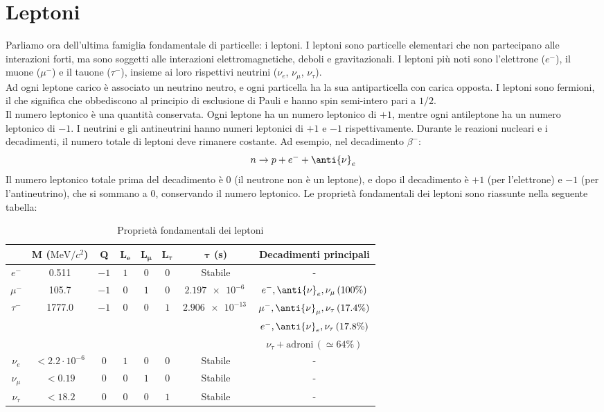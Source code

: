 \section{Leptoni}
Parliamo ora dell'ultima famiglia fondamentale di particelle: i leptoni. I leptoni sono particelle elementari che non partecipano alle interazioni forti, ma sono soggetti alle interazioni elettromagnetiche, deboli e gravitazionali. I leptoni più noti sono l'elettrone ($e^-$), il muone ($\mu^-$) e il tauone ($\tau^-$), insieme ai loro rispettivi neutrini ($\nu_{e}$, $\nu_{\mu}$, $\nu_{\tau}$).\\
Ad ogni leptone carico è associato un neutrino neutro, e ogni particella ha la sua antiparticella con carica opposta. I leptoni sono fermioni, il che significa che obbediscono al principio di esclusione di Pauli e hanno spin semi-intero pari a $1/2$.\\
Il numero leptonico è una quantità conservata. Ogni leptone ha un numero leptonico di $+1$, mentre ogni antileptone ha un numero leptonico di $-1$. I neutrini e gli antineutrini hanno numeri leptonici di $+1$ e $-1$ rispettivamente. Durante le reazioni nucleari e i decadimenti, il numero totale di leptoni deve rimanere costante. Ad esempio, nel decadimento $\beta^-$:
\begin{equation}
    n \to p + e^- + \anti{\nu}_{e}
\end{equation}
Il numero leptonico totale prima del decadimento è $0$ (il neutrone non è un leptone), e dopo il decadimento è $+1$ (per l'elettrone) e $-1$ (per l'antineutrino), che si sommano a $0$, conservando il numero leptonico. Le proprietà fondamentali dei leptoni sono riassunte nella seguente tabella:
\begin{table}[H]
    \centering
    \begin{tabular}{cccccccc}
        \hline
        & \textbf{M} ($\si{\mega\electronvolt/c^2}$) & \textbf{Q} & $\mathbf{L_{\boldsymbol{e}}}$ & $\mathbf{L_{\boldsymbol{\mu}}}$ & $\mathbf{L_{\boldsymbol{\tau}}}$ & $\boldsymbol{\tau}$ (s) & \textbf{Decadimenti principali} \\
        \hline
        $e^-$ & 0.511 & $-1$ & $1$ & $0$ & $0$ & Stabile & - \\[8pt]
        $\mu^-$ & 105.7 & $-1$ & $0$ & $1$ & $0$ & $\qty{2.197e-6}{}$ & $e^-,\anti{\nu}_{e},\nu_{\mu}\,(100\%)$ \\[8pt]
        $\tau^-$ & 1777.0 & $-1$ & $0$ & $0$ & $1$ & $\qty{2.906e-13}{}$ & $\mu^-,\anti{\nu}_{\mu},\nu_{\tau}\,(17.4\%)$ \\[8pt]
        &&&&&&& $e^-,\anti{\nu}_{e},\nu_{\tau}\,(17.8\%)$ \\[8pt]
        &&&&&&& $\nu_\tau + \text{adroni}\,(\simeq 64\%)$ \\[8pt]
        $\nu_{e}$ & $< 2.2 \cdot 10^{-6}$ & $0$ & $1$ & $0$ & $0$ & Stabile & - \\[8pt]
        $\nu_{\mu}$ & $< 0.19$ & $0$ & $0$ & $1$ & $0$ & Stabile & - \\[8pt]
        $\nu_{\tau}$ & $< 18.2$ & $0$ & $0$ & $0$ & $1$ & Stabile & - \\
        \hline
    \end{tabular}
    \caption{Proprietà fondamentali dei leptoni}
\end{table}

